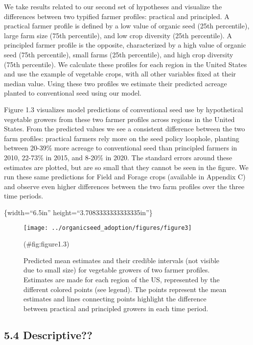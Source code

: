 \documentclass[twoside,12pt,final]{ucthesis-CA2012}
\begin{document}
\begin{ucmainmatter}
We take results related to our second set of hypotheses and visualize
the differences between two typified farmer profiles: practical and
principled. A practical farmer profile is defined by a low value of
organic seed (25th percentile), large farm size (75th percentile), and
low crop diversity (25th percentile). A principled farmer profile is the
opposite, characterized by a high value of organic seed (75th
percentile), small farms (25th percentile), and high crop diversity
(75th percentile). We calculate these profiles for each region in the
United States and use the example of vegetable crops, with all other
variables fixed at their median value. Using these two profiles we
estimate their predicted acreage planted to conventional seed using our
model.

Figure 1.3 visualizes model predictions of conventional seed use by
hypothetical vegetable growers from these two farmer profiles across
regions in the United States. From the predicted values we see a
consistent difference between the two farm profiles: practical farmers
rely more on the seed policy loophole, planting between 20-39\% more
acreage to conventional seed than principled farmers in 2010, 22-73\% in
2015, and 8-20\% in 2020. The standard errors around these estimates are
plotted, but are so small that they cannot be seen in the figure. We run
these same predictions for Field and Forage crops (available in Appendix
C) and observe even higher differences between the two farm profiles
over the three time periods.

\{width=``6.5in'' height=``3.7083333333333335in''\}
\begin{figure}

{\centering \texttt{[image: ../organicseed\_adoption/figures/figure3]} 

}

\caption{Predicted mean estimates and their credible intervals (not visible due to small size) for vegetable growers of two farmer profiles. Estimates are made for each region of the US, represented by the different colored points (see legend). The points represent the mean estimates and lines connecting points highlight the difference between practical and principled growers in each time period.  }(\#fig:figure1.3)
\end{figure}
\hypertarget{descriptive}{%
\subsection{5.4 Descriptive??}\label{descriptive}}


\end{ucmainmatter}
\end{document}
